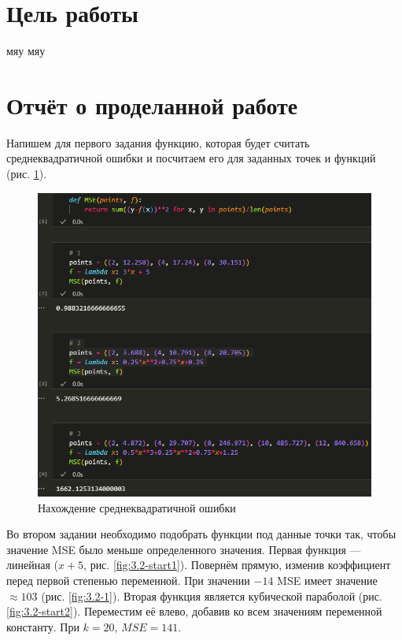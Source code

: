 \documentclass[14pt,a4paper]{extarticle}
\begin{document}


\section*{Цель работы}
мяу мяу


\section*{Отчёт о проделанной работе}
        Напишем для первого задания функцию, которая будет считать среднеквадратичной
ошибки и посчитаем его для заданных точек и функций (рис. \ref{fig:3.1}).

\begin{figure}[h!]
    \centering
    \includegraphics[width=0.7\linewidth]{figures/3.1.png}
    \caption{Нахождение среднеквадратичной ошибки}
    \label{fig:3.1}
\end{figure}

        Во втором задании необходимо подобрать функции под данные точки так, чтобы
значение MSE было меньше определенного значения. Первая функция --- линейная
($x+5$, рис. \ref{fig:3.2-start1}). Повернём прямую, изменив коэффициент перед
первой степенью переменной. При значении $-14$ MSE имеет значение $\approx 103$ (рис.  \ref{fig:3.2-1}).
Вторая функция является кубической параболой (рис. \ref{fig:3.2-start2}). Переместим
её влево, добавив ко всем значениям переменной константу. При $k=20$, $MSE=141$.
\newpage
\end{document}
